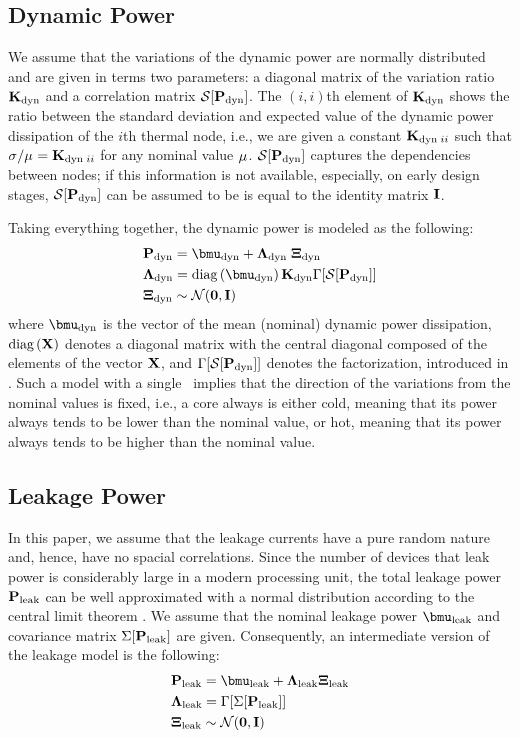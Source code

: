 \subsection{Dynamic Power}
We assume that the variations of the dynamic power are normally distributed and are given in terms two parameters: a diagonal matrix of the variation ratio $\mathbf{K}_{\text{dyn}}$ and a correlation matrix $\mathcal{S}[{\mathbf{P}_{\text{dyn}}}]$. The $(i,i)$th element of $\mathbf{K}_{\text{dyn}}$ shows the ratio between the standard deviation and expected value of the dynamic power dissipation of the $i$th thermal node, i.e., we are given a constant $\mathbf{K}_{\text{dyn} \; ii}$ such that $\sigma_{}/\mu_{} = \mathbf{K}_{\text{dyn} \; ii}$ for any nominal value $\mu_{}$. $\mathcal{S}[{\mathbf{P}_{\text{dyn}}}]$ captures the dependencies between nodes; if this information is not available, especially, on early design stages, $\mathcal{S}[{\mathbf{P}_{\text{dyn}}}]$ can be assumed to be is equal to the identity matrix $\mathbf{I}$.

Taking everything together, the dynamic power is modeled as the following:
\begin{align} \equlabel{dynamic-power}
  & \vpower_\dyn = \vmean{\dyn} + \ddev{\dyn} \; \vnormal_\dyn \\
  & \ddev{\dyn} = \diag{\vmean{\dyn}} \mratio_\dyn \factorize{\corr{\vpower_\dyn}} \nonumber \\
  & \vnormal_\dyn \sim \normal(\vzero, \mone) \nonumber
\end{align}
where $\vmean{\dyn}$ is the vector of the mean (nominal) dynamic power dissipation, $\text{diag}\left(\mathbf{X}\right)$ denotes a diagonal matrix with the central diagonal composed of the elements of the vector $\mathbf{X}$, and $\Gamma[\mathcal{S}[{\mathbf{P}_{\text{dyn}}}]]$ denotes the factorization, introduced in . Such a model with a single \mrv\ implies that the direction of the variations from the nominal values is fixed, i.e., a core always is either cold, meaning that its power always tends to be lower than the nominal value, or hot, meaning that its power always tends to be higher than the nominal value.

\subsection{Leakage Power}
In this paper, we assume that the leakage currents have a pure random nature and, hence, have no spacial correlations. Since the number of devices that leak power is considerably large in a modern processing unit, the total leakage power $\mathbf{P}_{\text{leak}}$ can be well approximated with a normal distribution \cite{srivastava2010} according to the central limit theorem \cite{durrett2010}. We assume that the nominal leakage power $\vmean{\leak}$ and covariance matrix $\Sigma[\mathbf{P}_{\text{leak}}]$ are given. Consequently, an intermediate version of the leakage model is the following:
\begin{align*}
  & \vpower_\leak = \vmean{\leak} + \ddev{\leak} \vnormal_\leak \\
  & \ddev{\leak} = \factorize{\cov{\vpower_\leak}} \\
  & \vnormal_\leak \sim \normal(\vzero, \mone)
\end{align*}

